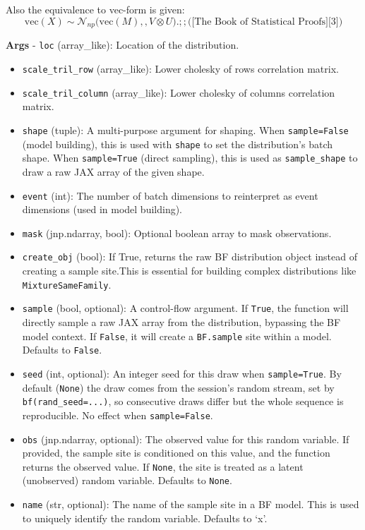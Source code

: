 \documentclass[
  letterpaper,
  DIV=11,
  numbers=noendperiod]{scrartcl}
\begin{document}
Also the equivalence to vec-form is given: \[
  \mathrm{vec}(X) \sim \mathcal N_{np}\big(\mathrm{vec}(M),,V\otimes U\big). ; ; \text{([The Book of Statistical Proofs][3])}
  \]

\textbf{Args} - \texttt{loc} (array\_like): Location of the
distribution.

\begin{itemize}
\item
  \texttt{scale\_tril\_row} (array\_like): Lower cholesky of rows
  correlation matrix.
\item
  \texttt{scale\_tril\_column} (array\_like): Lower cholesky of columns
  correlation matrix.
\item
  \texttt{shape} (tuple): A multi-purpose argument for shaping. When
  \texttt{sample=False} (model building), this is used with
  \texttt{shape} to set the distribution's batch shape. When
  \texttt{sample=True} (direct sampling), this is used as
  \texttt{sample\_shape} to draw a raw JAX array of the given shape.
\item
  \texttt{event} (int): The number of batch dimensions to reinterpret as
  event dimensions (used in model building).
\item
  \texttt{mask} (jnp.ndarray, bool): Optional boolean array to mask
  observations.
\item
  \texttt{create\_obj} (bool): If True, returns the raw BF distribution
  object instead of creating a sample site.This is essential for
  building complex distributions like \texttt{MixtureSameFamily}.
\item
  \texttt{sample} (bool, optional): A control-flow argument. If
  \texttt{True}, the function will directly sample a raw JAX array from
  the distribution, bypassing the BF model context. If \texttt{False},
  it will create a \texttt{BF.sample} site within a model. Defaults to
  \texttt{False}.
\item
  \texttt{seed} (int, optional): An integer seed for this draw when
  \texttt{sample=True}. By default (\texttt{None}) the draw comes from
  the session's random stream, set by \texttt{bf(rand\_seed=...)}, so
  consecutive draws differ but the whole sequence is reproducible. No
  effect when \texttt{sample=False}.
\item
  \texttt{obs} (jnp.ndarray, optional): The observed value for this
  random variable. If provided, the sample site is conditioned on this
  value, and the function returns the observed value. If \texttt{None},
  the site is treated as a latent (unobserved) random variable. Defaults
  to \texttt{None}.
\item
  \texttt{name} (str, optional): The name of the sample site in a BF
  model. This is used to uniquely identify the random variable. Defaults
  to `x'.
\end{itemize}
\end{document}
